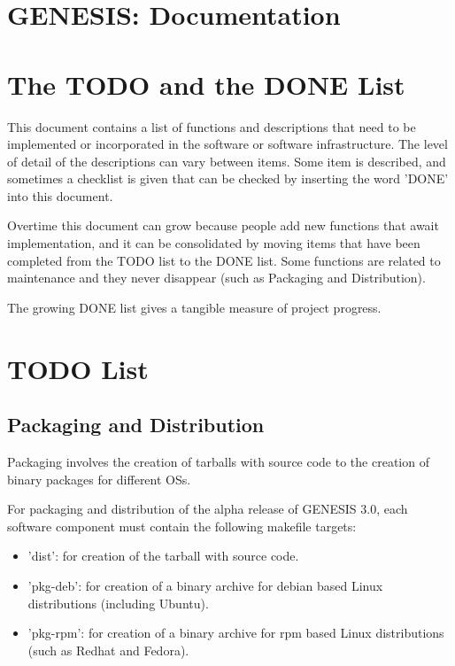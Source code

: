 \documentclass[12pt]{article}
\begin{document}
\section*{GENESIS: Documentation}

\section{The TODO and the DONE List}

This document contains a list of functions and descriptions that need
to be implemented or incorporated in the software or software
infrastructure.  The level of detail of the descriptions can vary
between items.  Some item is described, and sometimes a checklist is
given that can be checked by inserting the word 'DONE' into this
document.

Overtime this document can grow because people add new functions that
await implementation, and it can be consolidated by moving items that
have been completed from the TODO list to the DONE list.  Some
functions are related to maintenance and they never disappear (such as
Packaging and Distribution).

The growing DONE list gives a tangible measure of project progress.


\section{TODO List}

\subsection{Packaging and Distribution}

Packaging involves the creation of tarballs with source code to the
creation of binary packages for different OSs.

For packaging and distribution of the alpha release of GENESIS 3.0,
each software component must contain the following makefile targets:

\begin{itemize}
\item 'dist': for creation of the tarball with source code.
\item 'pkg-deb': for creation of a binary archive for debian based
  Linux distributions (including Ubuntu).
\item 'pkg-rpm': for creation of a binary archive for rpm based Linux
  distributions (such as Redhat and Fedora).
\end{itemize}
\end{document}
